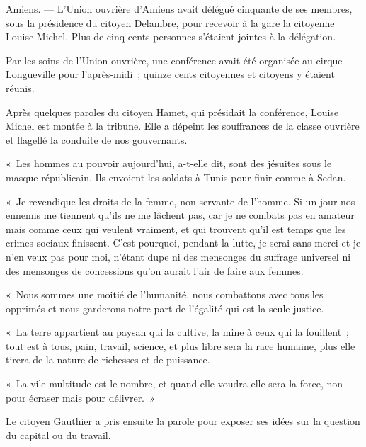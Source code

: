 \documentclass[french,twoside]{book} %
\newenvironment{quoteblock}%
  {\begin{quoting}}
  {\end{quoting}}
\newenvironment{quotebar}{%
    \def\FrameCommand{{\color{rubric!10!}\vrule width 0.5em} \hspace{0.9em}}%
    \def\OuterFrameSep{\itemsep} %
    \MakeFramed {\advance\hsize-\width \FrameRestore}
  }%
  {%
    \endMakeFramed
  }
\renewenvironment{quoteblock}%
  {%
    \savenotes
    \setstretch{0.9}
    \normalfont
    \begin{quotebar}
  }
  {%
    \end{quotebar}
    \spewnotes
  }
\begin{document}
\begin{quoteblock}
 \noindent Amiens. — L’Union ouvrière d’Amiens avait délégué cinquante de ses membres, sous la présidence du citoyen Delambre, pour recevoir à la gare la citoyenne Louise Michel. Plus de cinq cents personnes s’étaient jointes à la délégation.\par
 Par les soins de l’Union ouvrière, une conférence avait été organisée au cirque Longueville pour l’après-midi ; quinze cents citoyennes et citoyens y étaient réunis.\par
 Après quelques paroles du citoyen Hamet, qui présidait la conférence, Louise Michel est montée à la tribune. Elle a dépeint les souffrances de la classe ouvrière et flagellé la conduite de nos gouvernants.\par
 « Les hommes au pouvoir aujourd’hui, a-t-elle dit, sont des jésuites sous le masque républicain. Ils envoient les soldats à Tunis pour finir comme à Sedan.\par
 « Je revendique les droits de la femme, non servante de l’homme. Si un jour nos ennemis me tiennent qu’ils ne me lâchent pas, car je ne combats pas en amateur mais comme ceux qui veulent vraiment, et qui trouvent qu’il est temps que les crimes sociaux finissent. C’est pourquoi, pendant la lutte, je serai sans merci et je n’en veux pas pour moi, n’étant dupe ni des mensonges du suffrage universel ni des mensonges de concessions qu’on aurait l’air de faire aux femmes.\par
 « Nous sommes une moitié de l’humanité, nous combattons avec tous les opprimés et nous garderons notre part de l’égalité qui est la seule justice.\par
 « La terre appartient au paysan qui la cultive, la mine à ceux qui la fouillent ; tout est à tous, pain, travail, science, et plus libre sera la race humaine, plus elle tirera de la nature de richesses et de puissance.\par
 « La vile multitude est le nombre, et quand elle voudra elle sera la force, non pour écraser mais pour délivrer. »\par
 Le citoyen Gauthier a pris ensuite la parole pour exposer ses idées sur la question du capital ou du travail.
 \end{quoteblock}
\end{document}
